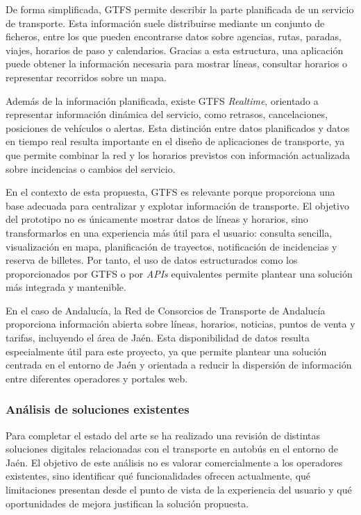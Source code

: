 De forma simplificada, GTFS permite describir la parte planificada de un servicio de transporte. Esta información suele distribuirse mediante un conjunto de ficheros, entre los que pueden encontrarse datos sobre agencias, rutas, paradas, viajes, horarios de paso y calendarios. Gracias a esta estructura, una aplicación puede obtener la información necesaria para mostrar líneas, consultar horarios o representar recorridos sobre un mapa.

Además de la información planificada, existe GTFS \textit{Realtime}, orientado a representar información dinámica del servicio, como retrasos, cancelaciones, posiciones de vehículos o alertas. Esta distinción entre datos planificados y datos en tiempo real resulta importante en el diseño de aplicaciones de transporte, ya que permite combinar la red y los horarios previstos con información actualizada sobre incidencias o cambios del servicio.

En el contexto de esta propuesta, GTFS es relevante porque proporciona una base adecuada para centralizar y explotar información de transporte. El objetivo del prototipo no es únicamente mostrar datos de líneas y horarios, sino transformarlos en una experiencia más útil para el usuario: consulta sencilla, visualización en mapa, planificación de trayectos, notificación de incidencias y reserva de billetes. Por tanto, el uso de datos estructurados como los proporcionados por GTFS o por \textit{APIs} equivalentes permite plantear una solución más integrada y mantenible.

En el caso de Andalucía, la Red de Consorcios de Transporte de Andalucía proporciona información abierta sobre líneas, horarios, noticias, puntos de venta y tarifas, incluyendo el área de Jaén. Esta disponibilidad de datos resulta especialmente útil para este proyecto, ya que permite plantear una solución centrada en el entorno de Jaén y orientada a reducir la dispersión de información entre diferentes operadores y portales web.

\subsubsection{Análisis de soluciones existentes}

Para completar el estado del arte se ha realizado una revisión de distintas soluciones digitales relacionadas con el transporte en autobús en el entorno de Jaén. El objetivo de este análisis no es valorar comercialmente a los operadores existentes, sino identificar qué funcionalidades ofrecen actualmente, qué limitaciones presentan desde el punto de vista de la experiencia del usuario y qué oportunidades de mejora justifican la solución propuesta.

